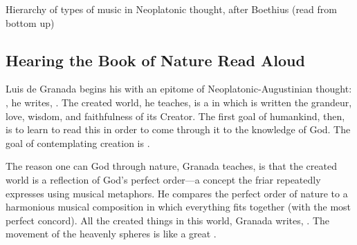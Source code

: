 
\begin{table}
    \caption{Hierarchy of types of music in Neoplatonic thought, after
    Boethius (read from bottom up)}
    \label{tab:Neoplatonic-hierarchy-music}
\end{table}

\subsection{Hearing the Book of Nature Read Aloud}

Luis de Granada begins his  with an
epitome of Neoplatonic-Augustinian thought: , he writes, .%
    \Autocite[182]{LuisdeGranada:Simbolo}
The created world, he teaches, is a  in which is written
the grandeur, love, wisdom, and faithfulness of its Creator.
The first goal of humankind, then, is to learn to read this  in order to come through it to the knowledge of God. 
The goal of contemplating creation is .%
    \Autocite[184]{LuisdeGranada:Simbolo}


The reason one can  God through nature, Granada teaches, is that
the created world is a reflection of God's perfect order---a concept the friar
repeatedly expresses using musical metaphors.
He compares the perfect order of nature to a harmonious musical composition in
which everything fits together  (with the most
perfect concord).
All the created things in this world, Granada writes, .%
    \Autocite[191]{LuisdeGranada:Simbolo}
The movement of the heavenly spheres is like a great .%
    \Autocite[191]{LuisdeGranada:Simbolo}

